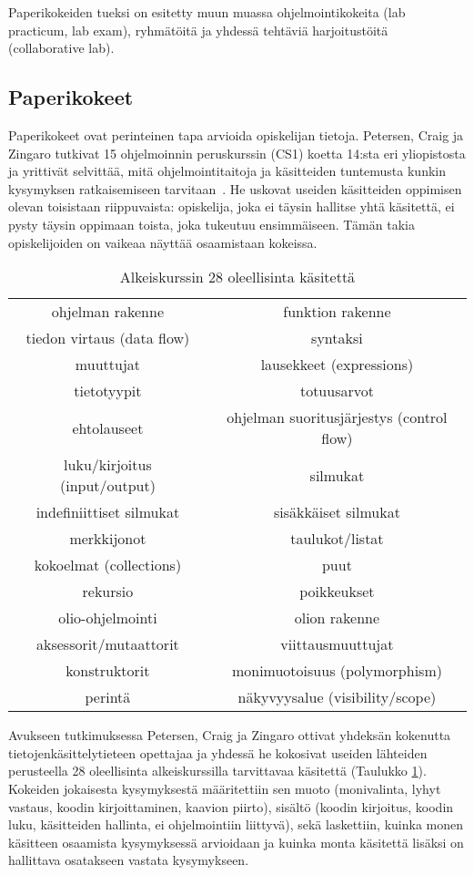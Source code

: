 \documentclass[finnish]{../tktltiki2}
\theoremstyle{definition}
\theoremstyle{remark}
\begin{document}
Paperikokeiden tueksi on esitetty muun muassa ohjelmointikokeita (lab practicum, lab exam), ryhmätöitä ja yhdessä tehtäviä harjoitustöitä (collaborative lab).

\subsection{Paperikokeet}

Paperikokeet ovat perinteinen tapa arvioida opiskelijan tietoja. Petersen, Craig ja Zingaro tutkivat 15 ohjelmoinnin peruskurssin (CS1) koetta 14:sta eri yliopistosta ja yrittivät selvittää, mitä ohjelmointitaitoja ja käsitteiden tuntemusta kunkin kysymyksen ratkaisemiseen tarvitaan~\cite{PCZ11}. He uskovat useiden käsitteiden oppimisen olevan toisistaan riippuvaista: opiskelija, joka ei täysin hallitse yhtä käsitettä, ei pysty täysin oppimaan toista, joka tukeutuu ensimmäiseen. Tämän takia opiskelijoiden on vaikeaa näyttää osaamistaan kokeissa.

\begin{table}[b!]
  \begin{tabular}{ c c }
    ohjelman rakenne & funktion rakenne \\
	tiedon virtaus (data flow) & syntaksi \\
    muuttujat & lausekkeet (expressions) \\
    tietotyypit & totuusarvot \\
	ehtolauseet & ohjelman suoritusjärjestys (control flow) \\
    luku/kirjoitus (input/output) & silmukat \\
    indefiniittiset silmukat & sisäkkäiset silmukat \\
	merkkijonot & taulukot/listat \\
    kokoelmat (collections) & puut \\
    rekursio & poikkeukset \\
	olio-ohjelmointi & olion rakenne \\
    aksessorit/mutaattorit & viittausmuuttujat \\
    konstruktorit & monimuotoisuus (polymorphism) \\
    perintä & näkyvyysalue (visibility/scope) \\
  \end{tabular}
\caption{Alkeiskurssin 28 oleellisinta käsitettä}
\label{tab:kasitteet}
\end{table}

Avukseen tutkimuksessa Petersen, Craig ja Zingaro ottivat yhdeksän kokenutta tietojenkäsittelytieteen opettajaa ja yhdessä he kokosivat useiden lähteiden perusteella 28 oleellisinta alkeiskurssilla tarvittavaa käsitettä (Taulukko \ref{tab:kasitteet}). Kokeiden jokaisesta kysymyksestä määritettiin sen muoto (monivalinta, lyhyt vastaus, koodin kirjoittaminen, kaavion piirto), sisältö (koodin kirjoitus, koodin luku, käsitteiden hallinta, ei ohjelmointiin liittyvä), sekä laskettiin, kuinka monen käsitteen osaamista kysymyksessä arvioidaan ja kuinka monta käsitettä lisäksi on hallittava osatakseen vastata kysymykseen.
\end{document}
